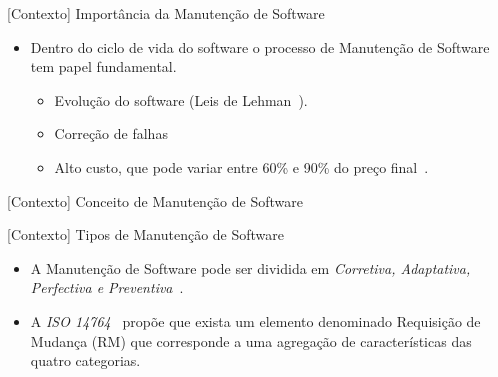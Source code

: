 \documentclass[t,14pt,mathserif]{beamer}
\begin{document}
\begin{frame}{[Contexto] Importância da Manutenção de Software}
	\begin{itemize}
        \item Dentro do ciclo de vida do software o processo de Manutenção de
            Software tem papel fundamental.
            \begin{itemize}
                \item Evolução do software (Leis de
                      Lehman~\cite{lehman1980understanding}).
                \item Correção de falhas
                \item Alto custo, que pode variar entre 60\% e 90\% do preço
                      final~\cite{kaur2015review}.
            \end{itemize}
	\end{itemize}
\end{frame}

\begin{frame}{[Contexto] Conceito de Manutenção de Software}
\end{frame}

\begin{frame}{[Contexto] Tipos de Manutenção de Software}
	\begin{itemize}

        \item A Manutenção de Software pode ser dividida em \textit{Corretiva,
              Adaptativa, Perfectiva e
              Preventiva}~\cite{Lientz:1980:SMM:601062,159342}.

        \item A \textit{ISO 14764}~\cite{1703974} propõe que exista um elemento
              denominado \alert{Requisição de Mudança (RM)} que corresponde a
              uma agregação de características das quatro categorias.

	\end{itemize}
\end{frame}
\end{document}

